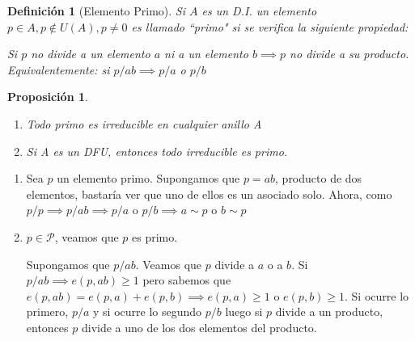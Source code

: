 \documentclass[11pt, a4paper, titlepage]{article}
\makeatletter
\renewenvironment{proof}[1][\proofname] {\vspace{-15pt}\par\pushQED{\qed}\normalfont\topsep6\p@\@plus6\p@\relax\trivlist\item[\hskip\labelsep\it#1\@addpunct{.}]\ignorespaces}{\popQED\endtrivlist\@endpefalse}
\theoremstyle{theorem-style}
\newtheorem*{nprop}{Proposición}
\theoremstyle{definition-style}
\newtheorem*{ndef}{Definición}
\theoremstyle{remark-style}
\theoremstyle{example-style}
\newenvironment{nlist}
{\begin{enumerate}
\renewcommand\labelenumi{(\emph{\roman{enumi})}}}
{\end{enumerate}}
\makeatother
\begin{document}
\begin{ndef}[Elemento Primo]
	Si $A$ es un D.I. un elemento $p\in A , p \notin U(A), p \ne 0$ es llamado “primo" si se verifica la siguiente propiedad:
	
	Si $p$ no divide a un elemento $a$ ni a un elemento $b \implies p$ no divide a su producto.\\
	Equivalentemente: si $p/ab \implies p/a$ o $p/b$  
	
\end{ndef}

\begin{nprop}
\begin{nlist}
	\item Todo primo es irreducible en cualquier anillo A
	\item Si A es un DFU, entonces todo irreducible es primo.
\end{nlist}
\end{nprop}
\begin{proof}
	\begin{nlist}
	\item Sea $p$ un elemento primo. Supongamos que $p=ab$, producto de dos elementos, bastaría ver que uno de ellos es un asociado solo. Ahora, como $p/p \implies p/ab \implies  p/a $ o $p/b \implies a \sim p$ o $b \sim p$
	
	\item $p \in \mathcal{P}$, veamos que $p$ es primo.
	
Supongamos que $p/ab$. Veamos que $p$ divide a $a$ o a $b$. 
Si $p/ab\implies e(p,ab) \geq 1$ pero sabemos que $e(p,ab) = e(p,a)+e(p,b) \implies e(p,a) \geq 1$ o $e(p,b) \geq 1$. Si ocurre lo primero, $p/a$ y si ocurre lo segundo $p/b$ luego si $p$ divide a un producto, entonces $p$ divide a uno de los dos elementos del producto.
\end{nlist}
\end{proof}
\end{document}
